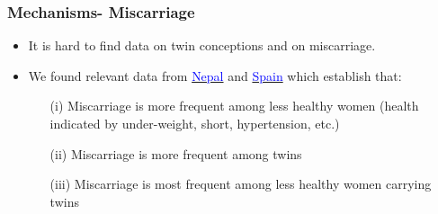 \documentclass[9pt,letterpaper,subeqn]{beamer}
\begin{document}

\begin{frame}[label=mech]
\frametitle{Mechanisms- Miscarriage}
\begin{itemize}
\item It is hard to find data on twin conceptions and on miscarriage. 
\item We found relevant data from \hyperlink{TwinDeathNepal}{\textcolor{blue}{Nepal}} and \hyperlink{TwinDeathSpain}{\textcolor{blue}{Spain}} which establish that:
\begin{enumerate}
\item[(i)] Miscarriage is more frequent among less healthy women (health indicated by under-weight, short, hypertension, etc.)
\item[(ii)] Miscarriage is more frequent among twins
\item[(iii)] Miscarriage is most frequent among less healthy women carrying twins
\end{enumerate}
\end{itemize}
\end{frame}



\end{document}
